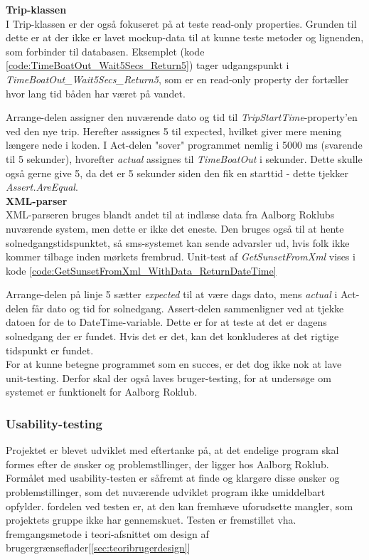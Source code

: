 \textbf{Trip-klassen}\\
I Trip-klassen er der også fokuseret på at teste read-only properties. Grunden til dette er at der ikke er lavet mockup-data til at kunne teste metoder og lignenden, som forbinder til databasen. Eksemplet (kode \ref{code:TimeBoatOut_Wait5Secs_Return5}) tager udgangspunkt i \textit{TimeBoatOut\_Wait5Secs\_Return5}, som er en read-only property der fortæller hvor lang tid båden har været på vandet.


Arrange-delen assigner den nuværende dato og tid til \textit{TripStartTime}-property'en ved den nye trip. Herefter asssignes 5 til expected, hvilket giver mere mening længere nede i koden. I Act-delen "sover" programmet nemlig i 5000 ms (svarende til 5 sekunder), hvorefter \textit{actual} assignes til \textit{TimeBoatOut} i sekunder. Dette skulle også gerne give 5, da det er 5 sekunder siden den fik en starttid - dette tjekker \textit{Assert.AreEqual}.\\

\textbf{XML-parser}\\
XML-parseren bruges blandt andet til at indlæse data fra Aalborg Roklubs nuværende system, men dette er ikke det eneste. Den bruges også til at hente solnedgangstidspunktet, så sms-systemet kan sende advarsler ud, hvis folk ikke kommer tilbage inden mørkets frembrud. Unit-test af \textit{GetSunsetFromXml} vises i kode \ref{code:GetSunsetFromXml_WithData_ReturnDateTime}


Arrange-delen på linje 5 sætter \textit{expected} til at være dags dato, mens \textit{actual} i Act-delen får dato og tid for solnedgang. Assert-delen sammenligner ved at tjekke datoen for de to DateTime-variable. Dette er for at teste at det er dagens solnedgang der er fundet. Hvis det er det, kan det konkluderes at det rigtige tidspunkt er fundet.\\

For at kunne betegne programmet som en succes, er det dog ikke nok at lave unit-testing. Derfor skal der også laves bruger-testing, for at undersøge om systemet er funktionelt for Aalborg Roklub.

\subsubsection{Usability-testing}
Projektet er blevet udviklet med eftertanke på, at det endelige program skal formes efter de ønsker og problemstllinger, der ligger hos Aalborg Roklub. Formålet med usability-testen er såfremt at finde og klargøre disse ønsker og problemstillinger, som det nuværende udviklet program ikke umiddelbart opfylder. fordelen ved testen er, at den kan fremhæve uforudsette mangler, som projektets gruppe ikke har gennemskuet. Testen er fremstillet vha. fremgangsmetode i teori-afsnittet om design af brugergrænseflader[\ref{sec:teoribrugerdesign}]\\

